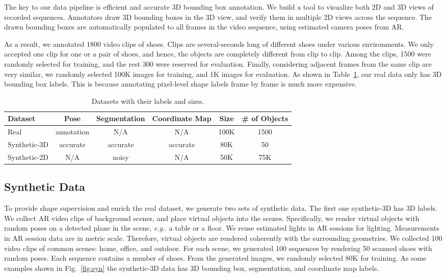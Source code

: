 \documentclass[runningheads]{llncs}
\makeatletter
\DeclareRobustCommand\onedot{\futurelet\@let@token\@onedot}
\def\@onedot{\ifx\@let@token.\else.\null\fi\xspace}
\def\eg{\emph{e.g}\onedot} \def\Eg{\emph{E.g}\onedot}
\makeatother
\begin{document}
The key to our data pipeline is efficient and accurate 3D bounding box annotation. We build a tool to visualize both 2D and 3D views of recorded sequences. Annotators draw 3D bounding boxes in the 3D view, and verify them in multiple 2D views across the sequence. The drawn bounding boxes are automatically populated to all frames in the video sequence, using estimated camera poses from AR. 

As a result, we annotated 1800 video clips of shoes. Clips are several-seconds long of different shoes under various environments. We only accepted one clip for one or a pair of shoes, and hence, the objects are completely different from clip to clip. Among the clips, 1500 were randomly selected for training, and the rest 300 were reserved for evaluation. Finally, considering adjacent frames from the same clip are very similar, we randomly selected 100K images for training, and 1K images for evaluation. As shown in Table~\ref{tab:data}, our real data only has 3D bounding box labels. This is because annotating pixel-level shape labels frame by frame is much more expensive.

\begin{table}[t]
\begin{center}
\begin{tabular}{l|c|c|c|c|c}\hline
Dataset & Pose & Segmentation & Coordinate Map & Size & \# of Objects \\
\hline
Real & annotation & N/A & N/A & 100K & 1500 \\
\hline
Synthetic-3D & accurate & accurate & accurate & 80K & 50 \\
\hline
Synthetic-2D & N/A & noisy & N/A & 50K & 75K\\
\hline
\end{tabular}
\caption{Datasets with their labels and sizes.}
\label{tab:data}
\end{center}
\end{table}

\subsection{Synthetic Data}

To provide shape supervision and enrich the real dataset, we generate two sets of synthetic data. The first one synthetic-3D has 3D labels. We collect AR video clips of background scenes, and place virtual objects into the scenes. Specifically, we render virtual objects with random poses on a detected plane in the scene, \eg a table or a floor. We reuse estimated lights in AR sessions for lighting. Measurements in AR session data are in metric scale. Therefore, virtual objects are rendered coherently with the surrounding geometries. We collected 100 video clips of common scenes: home, office, and outdoor. For each scene, we generated 100 sequences by rendering 50 scanned shoes with random poses. Each sequence contains a number of shoes. From the generated images, we randomly selected 80K for training. As some examples shown in Fig.~\ref{fig:syn} the synthetic-3D data has 3D bounding box, segmentation, and coordinate map labels.
\end{document}
